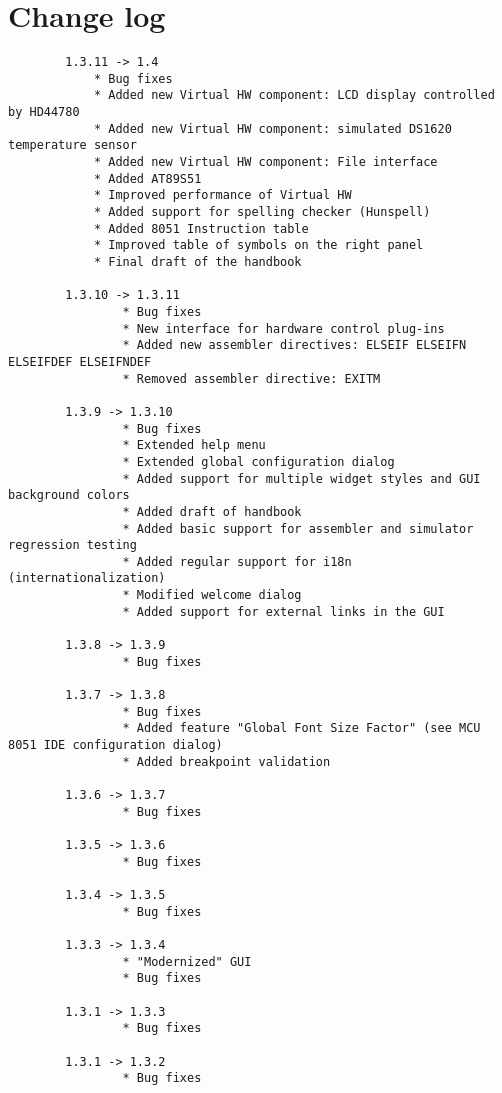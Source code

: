 \documentclass[a4paper,twoside,12pt]{book}
\newcommand{\mysmallfont}{\fontsize{8pt}{10pt} \selectfont{}}
\begin{document}
\chapter{Change log}
	{
	\mysmallfont{}
	\begin{verbatim}
		1.3.11 -> 1.4
			* Bug fixes
			* Added new Virtual HW component: LCD display controlled by HD44780
			* Added new Virtual HW component: simulated DS1620 temperature sensor
			* Added new Virtual HW component: File interface
			* Added AT89S51
			* Improved performance of Virtual HW
			* Added support for spelling checker (Hunspell)
			* Added 8051 Instruction table
			* Improved table of symbols on the right panel
			* Final draft of the handbook

		1.3.10 -> 1.3.11
		        * Bug fixes
		        * New interface for hardware control plug-ins
		        * Added new assembler directives: ELSEIF ELSEIFN ELSEIFDEF ELSEIFNDEF
		        * Removed assembler directive: EXITM

		1.3.9 -> 1.3.10
		        * Bug fixes
		        * Extended help menu
		        * Extended global configuration dialog
		        * Added support for multiple widget styles and GUI background colors
		        * Added draft of handbook
		        * Added basic support for assembler and simulator regression testing
		        * Added regular support for i18n (internationalization)
		        * Modified welcome dialog
		        * Added support for external links in the GUI

		1.3.8 -> 1.3.9
		        * Bug fixes

		1.3.7 -> 1.3.8
		        * Bug fixes
		        * Added feature "Global Font Size Factor" (see MCU 8051 IDE configuration dialog)
		        * Added breakpoint validation

		1.3.6 -> 1.3.7
		        * Bug fixes

		1.3.5 -> 1.3.6
		        * Bug fixes

		1.3.4 -> 1.3.5
		        * Bug fixes

		1.3.3 -> 1.3.4
		        * "Modernized" GUI
		        * Bug fixes

		1.3.1 -> 1.3.3
		        * Bug fixes

		1.3.1 -> 1.3.2
		        * Bug fixes


\end{verbatim}}
\end{document}
